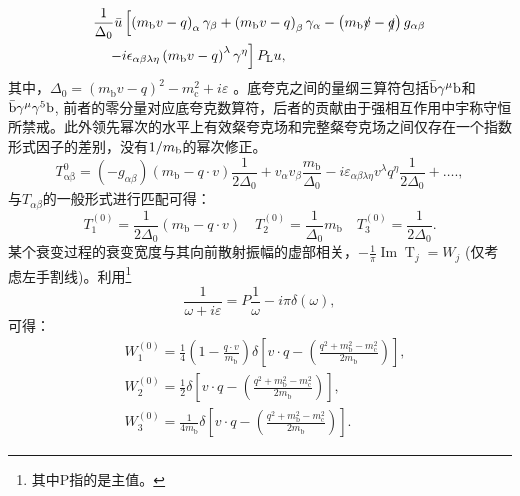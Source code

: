 \begin{equation}
    \begin{aligned}
    & \frac{1}{\Delta_0} \bar{u}\left[\left(m_{\mathrm{b}} v - q\right)_{\alpha} \gamma_{\beta} + \left(m_{\mathrm{b}} v - q\right)_{\beta} \gamma_{\alpha} - \left(m_{\mathrm{b}} \slashed{v} - \slashed{q}\right) g_{\alpha \beta}\right. \\
    & \left.\quad -i \epsilon_{\alpha \beta \lambda \eta} \left(m_{\mathrm{b}} v - q\right)^{\lambda} \gamma^{\eta} \right] P_{\mathrm{L}} u,
    \end{aligned}
\end{equation}
    其中，$\Delta_0 = \left( m_{\mathrm{b}} v - q \right)^2 - m_{\mathrm{c}}^2 + i \varepsilon$
。底夸克之间的量纲三算符包括$\mathrm{\bar{b}}\gamma^{\mu}\mathrm{b}$和$\mathrm{\bar{b}}\gamma^{\mu}\gamma^{5}\mathrm{b}$, 前者的零分量对应底夸克数算符，后者的贡献由于强相互作用中宇称守恒所禁戒。此外领先幂次的水平上有效粲夸克场和完整粲夸克场之间仅存在一个指数形式因子的差别，没有$1/m_{\mathrm{b}}$的幂次修正。
\begin{equation}
    T_{\mathrm{\alpha \beta}}^0 = \left( -g_{\alpha \beta} \right) \left( m_{\mathrm{b}} - q \cdot v \right) \frac{1}{2 \Delta_0} + v_{\alpha} v_{\beta} \frac{m_{\mathrm{b}}}{\Delta_0} - i \varepsilon_{\alpha \beta \lambda \eta} v^{\lambda} q^{\eta} \frac{1}{2 \Delta_0} + \ldots.,
\end{equation}
与$T_{\alpha\beta}$的一般形式进行匹配可得：
\begin{equation}
    T_1^{(0)} = \frac{1}{2 \Delta_0} \left( m_{\mathrm{b}} - q \cdot v \right) \quad T_2^{(0)} = \frac{1}{\Delta_0} m_{\mathrm{b}} \quad T_3^{(0)} = \frac{1}{2 \Delta_0}.
\end{equation}
某个衰变过程的衰变宽度与其向前散射振幅的虚部相关，$-\frac{1}{\pi} \operatorname{Im} \operatorname{T}_j=W_j$ (仅考虑左手割线)。利用\footnote{其中P指的是主值。}
\begin{equation}
    \frac{1}{\omega+i \varepsilon}=P \frac{1}{\omega}-i \pi \delta(\omega),
    \end{equation}
可得：
\begin{equation}
    \begin{aligned}
    & W_1^{(0)} = \frac{1}{4} \left( 1 - \frac{q \cdot v}{m_{\mathrm{b}}} \right) \delta\left[ v \cdot q - \left( \frac{q^2 + m_{\mathrm{b}}^2 - m_{\mathrm{c}}^2}{2 m_{\mathrm{b}}} \right) \right], \\
    & W_2^{(0)} = \frac{1}{2} \delta\left[ v \cdot q - \left( \frac{q^2 + m_{\mathrm{b}}^2 - m_{\mathrm{c}}^2}{2 m_{\mathrm{b}}} \right) \right], \\
    & W_3^{(0)} = \frac{1}{4 m_{\mathrm{b}}} \delta\left[ v \cdot q - \left( \frac{q^2 + m_{\mathrm{b}}^2 - m_{\mathrm{c}}^2}{2 m_{\mathrm{b}}} \right) \right].
    \end{aligned}
\end{equation}

